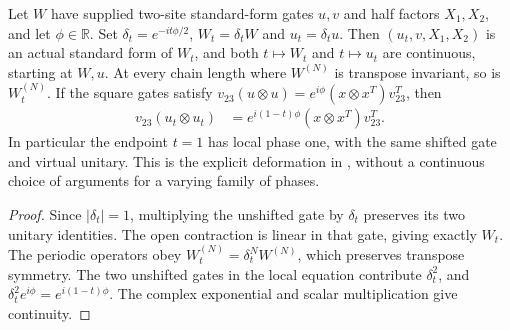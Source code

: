 \begin{lemma}
    \label{lem:mpu_transposition_phase_deformation}
    \leanok
    Let $W$ have supplied two-site standard-form gates $u,v$ and half factors
    $X_1,X_2$, and let $\phi\in\mathbb R$. Set
    $\delta_t=e^{-it\phi/2}$, $W_t=\delta_t W$ and $u_t=\delta_t u$.
    Then $(u_t,v,X_1,X_2)$ is an actual standard form of $W_t$, and both
    $t\mapsto W_t$ and $t\mapsto u_t$ are continuous, starting at $W,u$.
    At every chain length where $W^{(N)}$ is transpose invariant, so is
    $W_t^{(N)}$. If the square gates satisfy
    $v_{23}(u\otimes u)=e^{i\phi}(x\otimes x^T)v_{23}^T$, then
    \begin{align}
        v_{23}(u_t\otimes u_t)
         & =e^{i(1-t)\phi}(x\otimes x^T)v_{23}^T.
    \end{align}
    In particular the endpoint $t=1$ has local phase one, with the same
    shifted gate and virtual unitary. This is the explicit deformation in
    \cite[lines~1285--1288]{Cirac2017MPU}, without a continuous choice of
    arguments for a varying family of phases.
\end{lemma}

\begin{proof}\leanok
    Since $|\delta_t|=1$, multiplying the unshifted gate by $\delta_t$
    preserves its two unitary identities. The open contraction is linear in
    that gate, giving exactly $W_t$. The periodic operators obey
    $W_t^{(N)}=\delta_t^N W^{(N)}$, which preserves transpose symmetry.
    The two unshifted gates in the local equation contribute $\delta_t^2$,
    and $\delta_t^2e^{i\phi}=e^{i(1-t)\phi}$. The complex exponential and
    scalar multiplication give continuity.
\end{proof}

